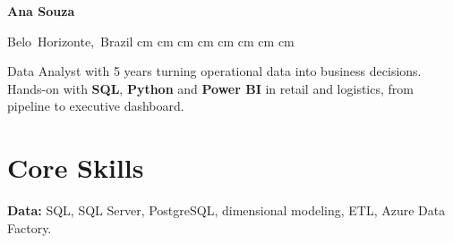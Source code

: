 \newcommand{\cvnome}{Ana Souza}
\newcommand{\cvrodape}{Page \thepage{} of \pageref*{LastPage}}


    \begin{header}
        \textbf{\fontsize{24 pt}{24 pt}\selectfont Ana Souza}

        \vspace{0.3 cm}

        \normalsize
        \mbox{{\color{black}\footnotesize\faMapMarker*}\hspace*{0.13cm}Belo Horizonte, Brazil}%
         cm%
        \AND%
         cm%
        \mbox{}%
         cm%
        \AND%
         cm%
        \mbox{}%
         cm%
        \AND%
         cm%
        \mbox{}%
         cm%
        \AND%
         cm%
        \mbox{}%
    \end{header}

    \vspace{0.3 cm - 0.3 cm}

    \begin{onecolentry}
        Data Analyst with 5 years turning operational data into business decisions. Hands-on with \textbf{SQL}, \textbf{Python} and \textbf{Power BI} in retail and logistics, from pipeline to executive dashboard.
    \end{onecolentry}

    \vspace{0.25 cm}

    \section{Core Skills}
        \begin{onecolentry}
            \textbf{Data:} SQL, SQL Server, PostgreSQL, dimensional modeling, ETL, Azure Data Factory.
        \end{onecolentry}

